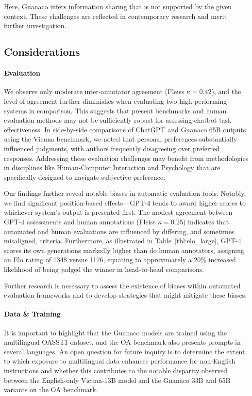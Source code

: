Here, {Guanaco} infers information sharing that is not supported by the given context. These challenges are reflected in contemporary research \cite{sap2022neural} and merit further investigation.

\subsection{Considerations}
\label{ssec:considerations}

\paragraph{Evaluation}

We observe only moderate inter-annotator agreement (Fleiss $\kappa=0.42$), and the level of agreement further diminishes when evaluating two high-performing systems in comparison. This suggests that present benchmarks and human evaluation methods may not be sufficiently robust for assessing chatbot task effectiveness. In side-by-side comparisons of ChatGPT and {Guanaco} 65B outputs using the Vicuna benchmark, we noted that personal preferences substantially influenced judgments, with authors frequently disagreeing over preferred responses. Addressing these evaluation challenges may benefit from methodologies in disciplines like Human-Computer Interaction and Psychology that are specifically designed to navigate subjective preference.

Our findings further reveal notable biases in automatic evaluation tools. Notably, we find significant position-based effects—GPT-4 tends to award higher scores to whichever system's output is presented first. The modest agreement between GPT-4 assessments and human annotations (Fleiss $\kappa=0.25$) indicates that automated and human evaluations are influenced by differing, and sometimes misaligned, criteria. Furthermore, as illustrated in Table~\ref{tbl:elo_large}, GPT-4 scores its own generations markedly higher than do human annotators, assigning an Elo rating of 1348 versus 1176, equating to approximately a 20\% increased likelihood of being judged the winner in head-to-head comparisons.

Further research is necessary to assess the existence of biases within automated evaluation frameworks and to develop strategies that might mitigate these biases.

\paragraph{Data \& Training} It is important to highlight that the {Guanaco} models are trained using the multilingual OASST1 dataset, and the OA benchmark also presents prompts in several languages. An open question for future inquiry is to determine the extent to which exposure to multilingual data enhances performance for non-English instructions and whether this contributes to the notable disparity observed between the English-only Vicuna-13B model and the {Guanaco} 33B and 65B variants on the OA benchmark.

